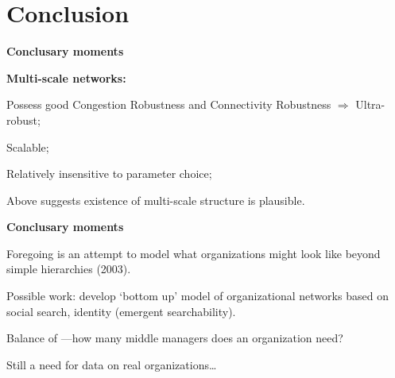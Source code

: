 \section{Conclusion}

  \textbf{Conclusary moments}

  \textbf{Multi-scale networks:}
    
    
      Possess good Congestion Robustness and
      Connectivity Robustness $\Rightarrow$ Ultra-robust;
    
      Scalable;
    
      Relatively insensitive to parameter choice;
    
    
    
      Above suggests existence of multi-scale structure is plausible.
    
  
  

  \textbf{Conclusary moments}

  
    
    
      Foregoing is an attempt to model what organizations
      might look like beyond simple hierarchies (2003).
    
      Possible work: develop `bottom up' model of organizational
      networks based on social search, identity 
      (emergent searchability).
    
      Balance of ---how many
      middle managers does an organization need?
    
      Still a need for data on real organizations\ldots
    
  






